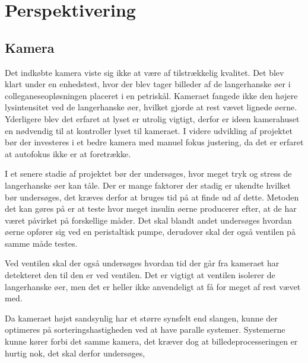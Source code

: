 \chapter{Perspektivering}
\section{Kamera}
Det indkøbte kamera viste sig ikke at være af tilstrækkelig kvalitet. Det blev klart under en enhedstest, hvor der blev tager billeder af de langerhanske øer i colleganeseopløsningen placeret i en petriskål. Kameraet fangede ikke den højere lysintensitet ved de langerhanske øer, hvilket gjorde at rest vævet lignede øerne. Yderligere blev det erfaret at lyset er utrolig vigtigt, derfor er ideen kamerahuset en nødvendig til at kontroller lyset til kameraet. I videre udvikling af projektet bør der investeres i et  bedre kamera med manuel fokus justering, da det er erfaret at autofokus ikke er at foretrække. 

I et senere stadie af projektet bør der undersøges, hvor meget tryk og stress de langerhanske øer kan tåle. Der er mange faktorer der stadig er ukendte hvilket bør undersøges, det kræves derfor at bruges tid på at finde ud af dette. Metoden det kan gøres på er at teste hvor meget insulin øerne producerer efter, at de har været påvirket på forskellige måder. Det skal blandt andet undersøges hvordan øerne opfører sig ved en peristaltisk pumpe, derudover skal der også ventilen på samme måde testes. 

Ved ventilen skal der også undersøges hvordan tid der går fra kameraet har detekteret den til den er ved ventilen. Det er vigtigt at ventilen isolerer de langerhanske øer, men det er heller ikke anvendeligt at få for meget af rest vævet med.

Da kameraet højst sandsynlig har et større synsfelt end slangen, kunne der optimeres på sorteringshastigheden ved at have paralle systemer. Systemerne kunne kører forbi det samme kamera, det kræver dog at billedeprocesseringen er hurtig nok, det skal derfor undersøges,

